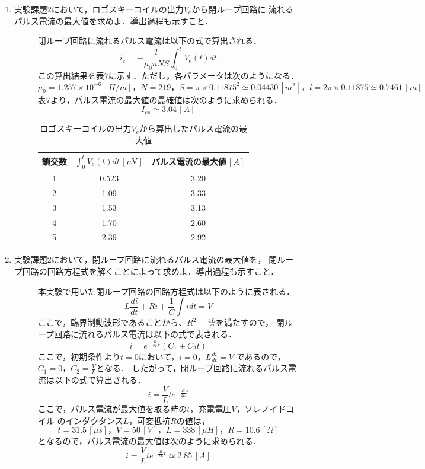 \begin{enumerate}
    \item 実験課題2において，ロゴスキーコイルの出力$V_e$から閉ループ回路に
    流れるパルス電流の最大値を求めよ．導出過程も示すこと．
    \begin{description}
        \item[] 閉ループ回路に流れるパルス電流は以下の式で算出される．
        $$
        i_e=-\frac{l}{\mu_0 nNS}\int_{0}^{t}V_e(t)dt
        $$
        この算出結果を表7に示す．ただし，各パラメータは次のようになる．
        $$
        \mu_0=1.257\times 10^{-6}\,[\si{H/m}]，N=219，S=\pi\times 0.11875^2\simeq 0.04430\,[\si{m^2}]，l=2\pi\times 0.11875\simeq 0.7461\,[\si{m}]
        $$
        表7より，パルス電流の最大値の最確値は次のように求められる．
        $$
        I_{es}\simeq 3.04\,[\si{A}]
        $$
        \begin{table}[H]
            \centering
            \caption{ロゴスキーコイルの出力$V_e$から算出したパルス電流の最大値}
            \begin{tabular}{c|c|c}
            \hline
                鎖交数 & $\int_{0}^{t}V_e(t)dt\,[\si{\mu \volt}]$ & パルス電流の最大値$\,[\si{A}]$ \\ \hline
                1 & 0.523 & 3.20 \\ 
                2 & 1.09 & 3.33 \\ 
                3 & 1.53 & 3.13 \\ 
                4 & 1.70 & 2.60 \\ 
                5 & 2.39 & 2.92 \\ \hline
            \end{tabular}
        \end{table}
    \end{description}
    
    \newpage

    \item 実験課題2において，閉ループ回路に流れるパルス電流の最大値を，
    閉ループ回路の回路方程式を解くことによって求めよ．導出過程も示すこと．
    \begin{description}
        \item[] 本実験で用いた閉ループ回路の回路方程式は以下のように表される．
        $$
        L\frac{di}{dt}+Ri+\frac{1}{C}\int idt=V
        $$
        ここで，臨界制動波形であることから、$R^2=\frac{4L}{C}$を満たすので，
        閉ループ回路に流れるパルス電流は以下の式で表される．
        $$
        i=e^{-\frac{R}{2L}t}(C_1+C_2t)
        $$
        ここで，初期条件より$t=0$において，$i=0$，$L\frac{di}{dt}=V$
        であるので，$C_1=0$，$C_2=\frac{V}{L}$となる．
        したがって，閉ループ回路に流れるパルス電流は以下の式で算出される．
        $$
        i=\frac{V}{L}te^{-\frac{R}{2L}t}
        $$
        ここで，パルス電流が最大値を取る時の$t$，充電電圧$V$，ソレノイドコイル
        のインダクタンス$L$，可変抵抗$R$の値は，
        $$
        t=31.5\,[\si{\mu s}]，V=50\,[\si{V}]，L=338\,[\si{\mu H}]，R=10.6\,[\si{\Omega}]
        $$
        となるので，パルス電流の最大値は次のように求められる．
        $$
        i=\frac{V}{L}te^{-\frac{R}{2L}t}\simeq 2.85\,[\si{A}]
        $$
    \end{description}
    

\end{enumerate}
